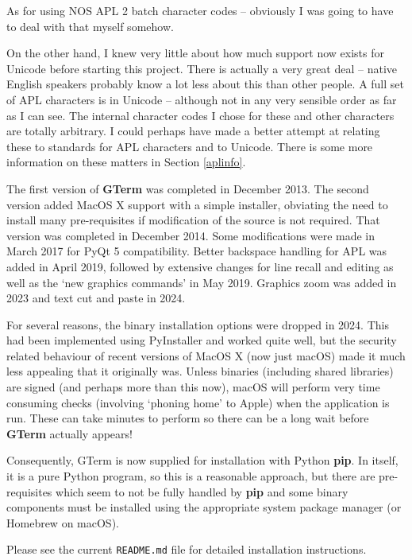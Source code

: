 \documentclass[a4paper,twoside,11pt]{article}
\newcommand{\newpara}{\par\vspace{4mm}\noindent}
\begin{document}
As for using NOS APL 2 batch character codes -- obviously I was going to have to deal with that
myself somehow.
\newpara
On the other hand, I knew very little about how much support now exists for Unicode before starting this project.
There is actually a very great deal -- native English speakers probably know a lot less about this than other people.
A full set of APL characters is in Unicode -- although not in any very sensible order as far as I can see. The
internal character codes I chose for these and other characters are totally arbitrary. I could perhaps have made a
better attempt at relating these to standards for APL characters and to Unicode. There is some more information
on these matters in Section \ref{aplinfo}.
\newpara
The first version of \textbf{GTerm} was completed in December 2013. The second version added MacOS X support with a 
simple installer, obviating the need to install many pre-requisites if modification of the source is not required.
That version was completed in December 2014. Some modifications were made in March 2017 for PyQt 5 compatibility.
Better backspace handling for APL was added in April 2019, followed by extensive changes for line recall and editing
as well as the `new graphics commands' in May 2019. Graphics zoom was added in 2023 and text cut and paste in 2024.
\newpara
For several reasons, the binary installation options were dropped in 2024. This had been implemented using PyInstaller and
worked quite well, but the security related behaviour of recent versions of MacOS X (now just macOS) made it much less
appealing that it originally was. Unless binaries (including shared libraries) are signed (and perhaps more than this now),
macOS will perform very time consuming checks (involving `phoning home' to Apple) when the application is run. These
can take minutes to perform so there can be a long wait before \textbf{GTerm} actually appears!
\newpara
Consequently, GTerm is now supplied for installation with Python \textbf{pip}. In itself, it is a pure Python program, so this is 
a reasonable approach, but there are pre-requisites which seem to not be fully handled by \textbf{pip} and some binary
components must be installed using the appropriate system package manager (or Homebrew on macOS).
\newpara
Please see the current \texttt{README.md} file for detailed installation instructions.
\end{document}
